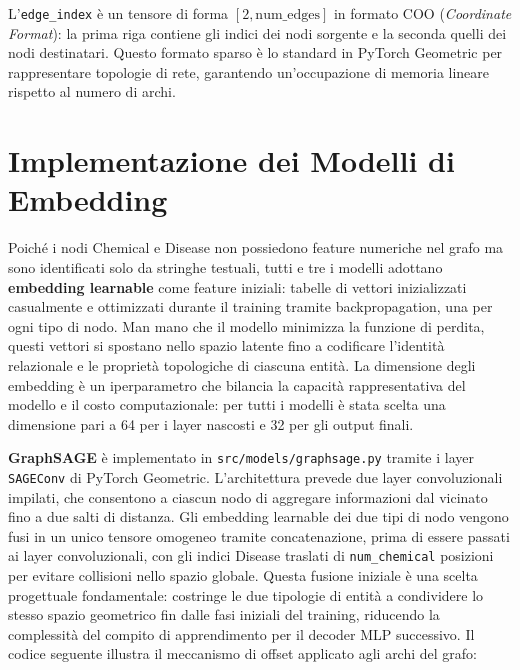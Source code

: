 L'\texttt{edge\_index} è un tensore di forma $[2, \text{num\_edges}]$ in formato COO (\textit{Coordinate Format}): la prima riga contiene gli indici dei nodi sorgente e la seconda quelli dei nodi destinatari. Questo formato sparso è lo standard in PyTorch Geometric per rappresentare topologie di rete, garantendo un'occupazione di memoria lineare rispetto al numero di archi.


\section{Implementazione dei Modelli di Embedding}

Poiché i nodi Chemical e Disease non possiedono feature numeriche nel grafo ma sono identificati solo da stringhe testuali, tutti e tre i modelli adottano \textbf{embedding learnable} come feature iniziali: tabelle di vettori inizializzati casualmente e ottimizzati durante il training tramite backpropagation, una per ogni tipo di nodo. Man mano che il modello minimizza la funzione di perdita, questi vettori si spostano nello spazio latente fino a codificare l'identità relazionale e le proprietà topologiche di ciascuna entità. La dimensione degli embedding è un iperparametro che bilancia la capacità rappresentativa del modello e il costo computazionale: per tutti i modelli è stata scelta una dimensione pari a 64 per i layer nascosti e 32 per gli output finali.

\textbf{GraphSAGE} è implementato in \texttt{src/models/graphsage.py} tramite i layer \texttt{SAGEConv} di PyTorch Geometric. L'architettura prevede due layer convoluzionali impilati, che consentono a ciascun nodo di aggregare informazioni dal vicinato fino a due salti di distanza. Gli embedding learnable dei due tipi di nodo vengono fusi in un unico tensore omogeneo tramite concatenazione, prima di essere passati ai layer convoluzionali, con gli indici Disease traslati di \texttt{num\_chemical} posizioni per evitare collisioni nello spazio globale. Questa fusione iniziale è una scelta progettuale fondamentale: costringe le due tipologie di entità a condividere lo stesso spazio geometrico fin dalle fasi iniziali del training, riducendo la complessità del compito di apprendimento per il decoder MLP successivo. Il codice seguente illustra il meccanismo di offset applicato agli archi del grafo:


